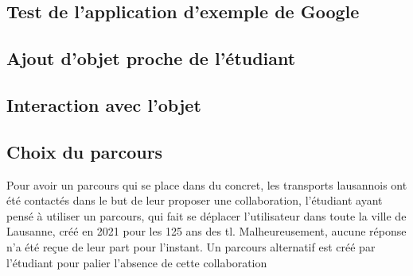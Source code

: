 \subsection{Test de l'application d'exemple de Google}

\subsection{Ajout d'objet proche de l'étudiant}

\subsection{Interaction avec l'objet}

\subsection{Choix du parcours}
Pour avoir un parcours qui se place dans du concret, les transports lausannois
ont été contactés dans le but de leur proposer une collaboration, l'étudiant ayant pensé à
utiliser un parcours, qui fait se déplacer l'utilisateur dans toute la ville de Lausanne,
créé en 2021 pour les 125 ans des tl.\cite{hatetVeriteLionsLausannois2021} Malheureusement, aucune réponse n'a été reçue de leur
part pour l'instant. Un parcours alternatif est créé par l'étudiant pour palier l'absence de
cette collaboration





